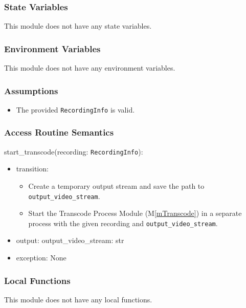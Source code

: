 \documentclass[12pt, titlepage]{article}
\newcommand{\mref}[1]{M\ref{#1}}
\begin{document}
\subsubsection{State Variables}

This module does not have any state variables.

\subsubsection{Environment Variables}

This module does not have any environment variables.

\subsubsection{Assumptions}

\begin{itemize}
  \item The provided \texttt{RecordingInfo} is valid.
\end{itemize}

\subsubsection{Access Routine Semantics}

\noindent start\_transcode(recording: \texttt{RecordingInfo}):
\begin{itemize}
  \item transition:
        \begin{itemize}
          \item Create a temporary output stream and save the path to
                \texttt{output\_video\_stream}.
          \item Start the Transcode Process Module (\mref{mTranscode}) in a separate process
                with the given recording and \texttt{output\_video\_stream}.
        \end{itemize}
  \item output: output\_video\_stream: str
  \item exception: None
\end{itemize}

\subsubsection{Local Functions}

This module does not have any local functions.
\end{document}
